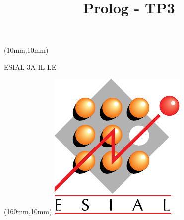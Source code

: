 \documentclass[a4paper]{article}
\title{Prolog - TP3}
\date{}
\begin{document}
\maketitle
\begin{textblock*}{4cm}(10mm,10mm)
\begin{Large}ESIAL 3A IL LE\end{Large}
\end{textblock*}
\begin{textblock*}{3cm}(160mm,10mm)
\includegraphics[width=\textwidth]{../../ESIAL.pdf}
\end{textblock*}
\end{document}

